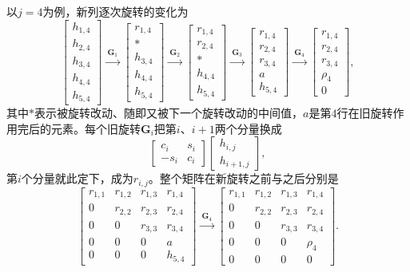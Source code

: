 以$j=4$为例，新列逐次旋转的变化为
\[
 \begin{bmatrix}h_{1,4}\\h_{2,4}\\h_{3,4}\\h_{4,4}\\h_{5,4}\end{bmatrix}
 \xrightarrow{\ \bm G_1\ }
 \begin{bmatrix}r_{1,4}\\\ast\\h_{3,4}\\h_{4,4}\\h_{5,4}\end{bmatrix}
 \xrightarrow{\ \bm G_2\ }
 \begin{bmatrix}r_{1,4}\\r_{2,4}\\\ast\\h_{4,4}\\h_{5,4}\end{bmatrix}
 \xrightarrow{\ \bm G_3\ }
 \begin{bmatrix}r_{1,4}\\r_{2,4}\\r_{3,4}\\a\\h_{5,4}\end{bmatrix}
 \xrightarrow{\ \bm G_4\ }
 \begin{bmatrix}r_{1,4}\\r_{2,4}\\r_{3,4}\\\rho_4\\0\end{bmatrix},
\]
其中$\ast$表示被旋转改动、随即又被下一个旋转改动的中间值，$a$是第$4$行在旧旋转作用完后的元素。每个旧旋转$\bm G_i$把第$i$、$i+1$两个分量换成
\[
 \begin{bmatrix}c_i&s_i\\-s_i&c_i\end{bmatrix}
 \begin{bmatrix}h_{i,j}\\h_{i+1,j}\end{bmatrix},
\]
第$i$个分量就此定下，成为$r_{i,j}$。整个矩阵在新旋转之前与之后分别是
\[
 \begin{bmatrix}
 r_{1,1}&r_{1,2}&r_{1,3}&r_{1,4}\\
 0&r_{2,2}&r_{2,3}&r_{2,4}\\
 0&0&r_{3,3}&r_{3,4}\\
 0&0&0&a\\
 0&0&0&h_{5,4}
 \end{bmatrix}
 \xrightarrow{\ \bm G_4\ }
 \begin{bmatrix}
 r_{1,1}&r_{1,2}&r_{1,3}&r_{1,4}\\
 0&r_{2,2}&r_{2,3}&r_{2,4}\\
 0&0&r_{3,3}&r_{3,4}\\
 0&0&0&\rho_4\\
 0&0&0&0
 \end{bmatrix}.
\]
